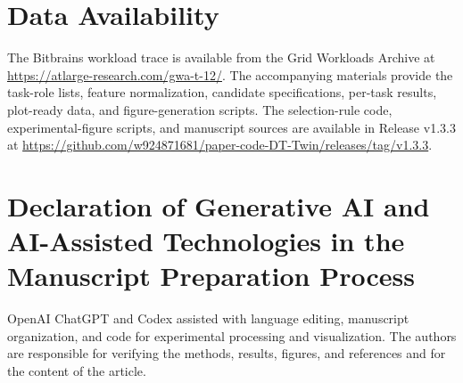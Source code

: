 \documentclass[a4paper,fleqn]{cas-sc}
\begin{document}
\section*{Data Availability}
The Bitbrains workload trace is available from the Grid Workloads Archive
at \url{https://atlarge-research.com/gwa-t-12/}. The accompanying materials
provide the task-role lists, feature normalization, candidate specifications,
per-task results, plot-ready data, and figure-generation scripts.
The selection-rule code, experimental-figure scripts, and manuscript sources
are available in Release v1.3.3 at
\url{https://github.com/w924871681/paper-code-DT-Twin/releases/tag/v1.3.3}.

\section*{Declaration of Generative AI and AI-Assisted Technologies
in the Manuscript Preparation Process}
OpenAI ChatGPT and Codex assisted with language editing, manuscript
organization, and code for experimental processing and visualization.
The authors are responsible for verifying the methods, results, figures,
and references and for the content of the article.
\end{document}
